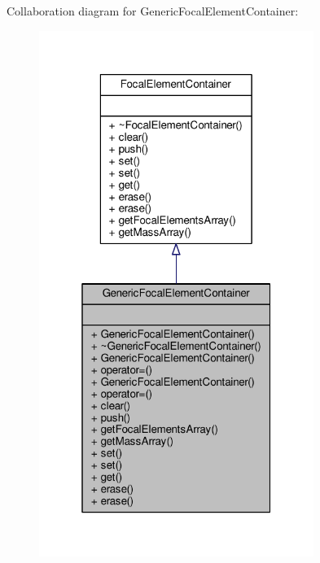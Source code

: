 Collaboration diagram for Generic\+Focal\+Element\+Container\+:\nopagebreak
\begin{figure}[H]
\begin{center}
\leavevmode
\includegraphics[width=253pt]{classGenericFocalElementContainer__coll__graph}
\end{center}
\end{figure}
